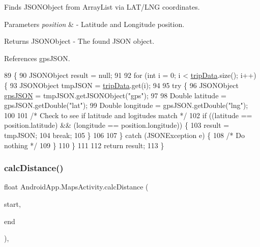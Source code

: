Finds J\+S\+O\+N\+Object from Array\+List via L\+A\+T/\+L\+NG coordinates. 


\begin{DoxyParams}{Parameters}
{\em position} & -\/ Latitude and Longitude position. \\
\hline
\end{DoxyParams}
\begin{DoxyReturn}{Returns}
J\+S\+O\+N\+Object -\/ The found J\+S\+ON object. 
\end{DoxyReturn}


References gps\+J\+S\+ON.


\begin{DoxyCode}
89                                                          \{
90         JSONObject result = null;
91 
92         \textcolor{keywordflow}{for} (\textcolor{keywordtype}{int} i = 0; i < \hyperlink{class_android_app_1_1_maps_activity_ad2fa23bd9f7f5a501e91329413608528}{tripData}.size(); i++) \{
93             JSONObject tmpJSON = \hyperlink{class_android_app_1_1_maps_activity_ad2fa23bd9f7f5a501e91329413608528}{tripData}.get(i);
94 
95             \textcolor{keywordflow}{try} \{
96                 JSONObject \hyperlink{logging-device_8ino_a548727e041a5cd3db91bdbd0ccd71e30}{gpsJSON} = tmpJSON.getJSONObject(\textcolor{stringliteral}{"gps"});
97 
98                 Double latitude = gpsJSON.getDouble(\textcolor{stringliteral}{"lat"});
99                 Double longitude = gpsJSON.getDouble(\textcolor{stringliteral}{"lng"});
100 
101                 \textcolor{comment}{/* Check to see if latitude and logitudes match */}
102                 \textcolor{keywordflow}{if} ((latitude == position.latitude) && (longitude == position.longitude)) \{
103                     result = tmpJSON;
104                     \textcolor{keywordflow}{break};
105                 \}
106 
107             \} \textcolor{keywordflow}{catch} (JSONException e) \{
108                 \textcolor{comment}{/* Do nothing */}
109             \}
110         \}
111 
112         \textcolor{keywordflow}{return} result;
113     \}
\end{DoxyCode}
\mbox{\label{class_android_app_1_1_maps_activity_aea9b9fe75f1d70e3c902c8348823efd0}} 
\subsubsection{\texorpdfstring{calc\+Distance()}{calcDistance()}}
{\footnotesize\ttfamily float Android\+App.\+Maps\+Activity.\+calc\+Distance (\begin{DoxyParamCaption}\item[{Lat\+Lng}]{start,  }\item[{Lat\+Lng}]{end }\end{DoxyParamCaption})\hspace{0.3cm}{\ttfamily [inline]}, {\ttfamily [private]}}



